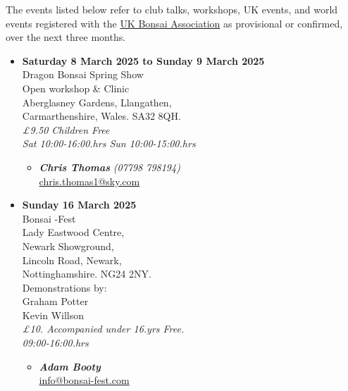 \label{2025-02-events}
\noindent
The events listed below refer to club talks, workshops, UK events, and world events registered with the \href{https://www.ukbonsaiassoc.org/events.html}{UK Bonsai Association} as provisional or confirmed, over the next three months.

\begin{itemize}
    \item \textbf{Saturday 8 March 2025 to Sunday 9 March 2025}
    \\
    Dragon Bonsai Spring Show \\
    Open workshop \& Clinic \\
    Aberglasney Gardens, Llangathen, \\
    Carmarthenshire, Wales. SA32 8QH.
    \\
    \emph{£9.50 Children Free} \\
    \emph{Sat 10:00-16:00.hrs Sun 10:00-15:00.hrs}
    \begin{itemize}
        \item \textbf{\emph{Chris Thomas}} \emph{(07798 798194)} \\
        \href{mailto:chris.thomas1@sky.com}{chris.thomas1@sky.com}
    \end{itemize}

    \item \textbf{Sunday 16 March 2025}
    \\
    Bonsai -Fest \\
    Lady Eastwood Centre, \\
    Newark Showground, \\
    Lincoln Road, Newark, \\
    Nottinghamshire. NG24 2NY. \\
    Demonstrations by: \\
    Graham Potter \\
    Kevin Willson
    \\
    \emph{£10. Accompanied under 16.yrs Free.} \\
    \emph{09:00-16:00.hrs}
    \begin{itemize}
        \item \textbf{\emph{Adam Booty}} \\
        \href{mailto:info@bonsai-fest.com}{info@bonsai-fest.com}
    \end{itemize}


\end{itemize}
